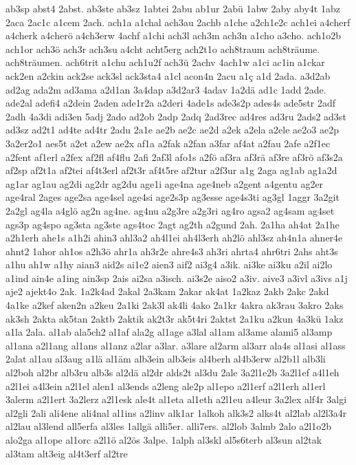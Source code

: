 {ab3sp
abst4
2abst.
ab3ste
ab3sz
1abtei
2abu
ab1ur
2abü
1abw
2aby
aby4t
1abz
2aca
2ac1c
a1cem
2ach.
ach1a
a1chal
ach3au
2achb
a1che
a2ch1e2c
ach1ei
a4cherf
a4cherk
a4cherö
a4ch3erw
4achf
a1chi
ach3l
ach3m
ach3n
a1cho
a3cho.
ach1o2b
ach1or
ach3ö
ach3r
ach3su
a4cht
acht5erg
ach2t1o
ach8traum
ach8träume.
ach8träumen.
ach6trit
a1chu
ach1u2f
ach3ü
2achv
4ach1w
a1ci
ac1in
a1ckar
ack2en
a2ckin
ack2se
ack3sl
ack3sta4
a1cl
acon4n
2acu
a1ç
a1d
2ada.
a3d2ab
ad2ag
ada2m
ad3ama
a2d1an
3a4dap
a3d2ar3
4adav
1a2dä
ad1c
1add
2ade.
ade2al
adefi4
a2dein
2aden
ade1r2a
a2deri
4ade1s
ade3s2p
ades4s
ade5str
2adf
2adh
4a3di
adi3en
5adj
2ado
ad2ob
2adp
2adq
2ad3rec
ad4res
ad3ru
2ads2
ad3st
ad3sz
ad2t1
ad4te
ad4tr
2adu
2a1e
ae2b
ae2c
ae2d
a2ek
a2ela
a2ele
ae2o3
ae2p
3a2er2o1
aes5t
a2et
a2ew
ae2x
af1a
a2fak
a2fan
a3far
af4at
a2fau
2afe
a2f1ec
a2fent
af1erl
a2fex
af2fl
af4flu
2afi
2af3l
afo1s
a2fö
af3ra
af3rä
af3re
af3rö
af3s2a
af2sp
af2t1a
af2tei
af4t3erl
af2t3r
af4t5re
af2tur
a2f3ur
a1g
2aga
ag1ab
ag1a2d
ag1ar
ag1au
ag2di
ag2dr
ag2du
age1i
age4na
age4neb
a2gent
a4gentu
ag2er
age4ral
2ages
age2sa
age4sel
age4si
age2s3p
ag3esse
age4s3ti
ag3gl
1aggr
3a2git
2a2gl
ag4la
a4glö
ag2n
ag4ne.
ag4nu
a2g3re
a2g3ri
ag4ro
agsa2
ag4sam
ag4set
ags3p
ag4spo
ag3sta
ag3ste
ags4toc
2agt
ag2th
a2gund
2ah.
2a1ha
ah4at
2a1he
a2h1erh
ahe1s
a1h2i
ahin3
ahl3a2
ah4l1ei
ah4l3erh
ah2lö
ahl3sz
ah4n1a
ahner4e
ahnt2
1ahor
ah1os
a2h3ö
ahr1a
ah3r2e
ahre4s3
ah3ri
ahrta4
ahr6tri
2ahs
aht3s
a1hu
ah1w
a1hy
aian3
aid2s
ai1e2
aien3
aif2
ai3g4
a3ik.
ai3ke
ai3ku
a2il
ai2lo
a1ind
ain4e
a1ing
ain3sp
2ais
ai2sa
a3isch.
ai3s2e
aiso2
a3iv.
aive3
a3ivl
a3ivs
a1j
aje2
ajekt4o
2ak.
1a2k4ad
2akal
2a3kam
2akar
ak4at
1a2kaz
2akb
2akc
2akd
4a1ke
a2kef
aken2n
a2keu
2a1ki
2ak3l
ak4li
4ako
2a1kr
4akra
ak3rau
3akro
2aks
ak3sh
2akta
ak5tan
2aktb
2aktik
ak2t3r
ak5t4ri
2aktst
2a1ku
a2kun
4a3kü
1akz
a1la
2ala.
al1ab
ala5ch2
al1af
ala2g
al1age
a3lal
al1am
al3ame
alami5
al3amp
al1ana
a2l1ang
al1ans
al1anz
a2lar
a3lar.
a3lare
al2arm
al3arr
ala4s
al1asi
al1ass
2alat
al1au
al3aug
a1lä
al1äm
alb3ein
alb3eis
al4berh
al4b3erw
al2b1l
alb3li
al2boh
al2br
alb3ru
alb3s
al2dä
al2dr
alds2t
al3du
2ale
3a2l1e2b
3a2l1ef
a4l1eh
a2l1ei
a4l3ein
a2l1el
alen1
al3ends
a2leng
ale2p
al1epo
a2l1erf
a2l1erh
al1erl
3alerm
a2l1ert
3a2lerz
a2l1esk
ale4t
al1eta
al1eth
a2l1eu
a4leur
3a2lex
alf4r
3algi
al2gli
2ali
ali4ene
ali4nal
al1ins
a2linv
alk1ar
1alkoh
alk3s2
alks4t
al2lab
al2l3a4r
al2lau
al3lend
all5erfa
al3les
1allgä
alli5er.
alli7ers.
al2lob
3almb
2alo
a2l1o2b
alo2ga
al1ope
al1orc
a2l1ö
al2ös
3alpe.
1alph
al3skl
al5s6terb
al3sun
al2tak
al3tam
alt3eig
al4t3erf
al2tre
}
